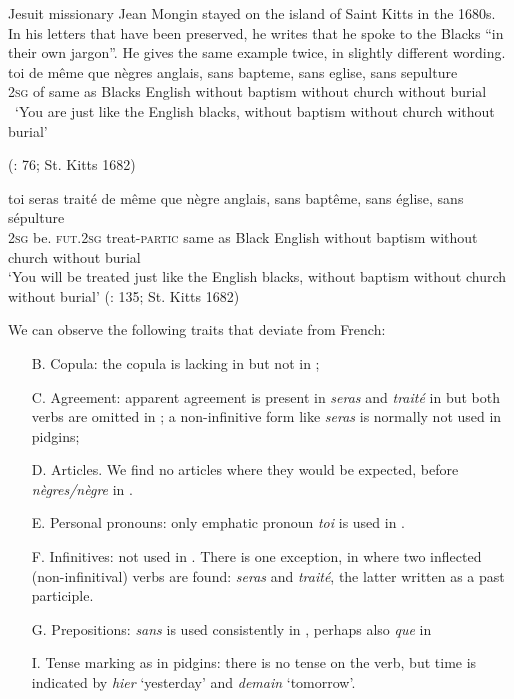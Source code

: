 \documentclass[output=paper,colorlinks,citecolor=brown]{langscibook}
\begin{document}
\ea \label{ex:bakker:15}
Jesuit missionary Jean Mongin stayed on the island of Saint Kitts in the 1680s. In his letters that have been preserved, he writes that he spoke to the Blacks “in their own jargon”.
 He gives the same example twice, in slightly different wording.
\ea\label{ex:bakker:15a}
\gll  toi de même que nègres anglais, sans bapteme, sans eglise, sans sepulture\\
2\textsc{sg} of same as Blacks English without baptism without church without burial\\\
\glt `You are just like the English blacks, without baptism without church without burial'

(\citealt{Chatillon1984}: 76; St. Kitts 1682)

\ex\label{ex:bakker:15b}
\gll toi seras traité de même que nègre anglais, sans baptême, sans église, sans sépulture\\
2\textsc{sg} be. \textsc{fut.}2\textsc{sg} treat-\textsc{partic} same as Black English without baptism without church without burial\\
\glt `You will be treated just like the English blacks, without baptism without church without burial'
 (\citealt{Chatillon1984}: 135; St. Kitts 1682)
\z
\z

\noindent We can observe the following traits that deviate from French:
\begin{itemize}
\item [B.] Copula: the copula is lacking in  but not in ;
\item[C.] Agreement: apparent agreement is present in \textit{seras} and \textit{traité} in  but both verbs are omitted in ; a non-infinitive form like \textit{seras} is normally not used in pidgins;
\item[D.] Articles. We find no articles where they would be expected, before \textit{nègres/nègre} in .
\item [E.] Personal pronouns: only emphatic pronoun \textit{toi} is used in .
\item[F.] Infinitives: not used in . There is one exception, in  where two inflected (non-infinitival) verbs are found: \textit{seras} and \textit{traité}, the latter written as a past participle.
\item[G.] Prepositions: \textit{sans} is used consistently in \REF{ex:bakker:15}, perhaps also \textit{que} in \REF{ex:bakker:15a}
\item[I.] Tense marking as in pidgins: there is no tense on the verb, but time is indicated by \textit{hier} `yesterday'  and \textit{demain} `tomorrow'.
\end{itemize}
\end{document}
